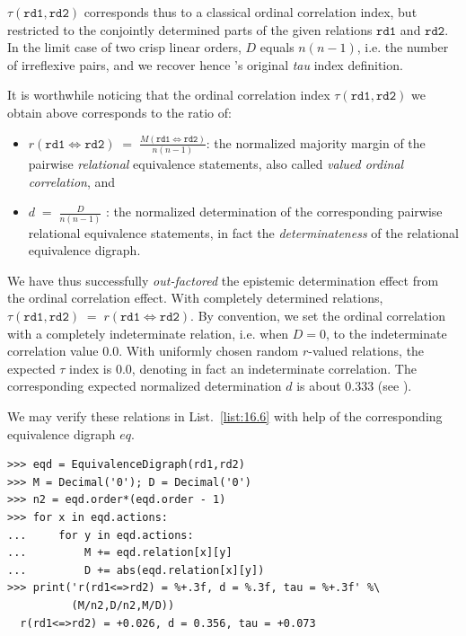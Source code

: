 $\tau(\mathtt{rd1},\mathtt{rd2})$ corresponds thus to a classical ordinal correlation index, but restricted to the conjointly determined parts of the given relations $\mathtt{rd1}$ and $\mathtt{rd2}$. In the limit case of two crisp linear orders, $D$ equals $n(n-1)$, i.e. the number of irreflexive pairs, and we recover hence \Kendall 's original \emph{tau} index definition.

It is worthwhile noticing that the ordinal correlation index $\tau(\mathtt{rd1},\mathtt{rd2})$ we obtain above corresponds to the ratio of:
\begin{itemize}
\item $r(\mathtt{rd1} \Leftrightarrow \mathtt{rd2}) \;=\; \frac{M(\mathtt{rd1} \Leftrightarrow \mathtt{rd2})}{n(n-1)}$: the normalized majority margin of the pairwise \emph{relational} equivalence statements, also called \emph{valued ordinal correlation}, and 
\item $d \;=\; \frac{D}{n(n-1)}$ : the normalized determination of the corresponding pairwise relational equivalence statements, in fact the \emph{determinateness} of the relational equivalence digraph.
\end{itemize}

We have thus successfully \emph{out-factored} the epistemic determination effect from the ordinal correlation effect. With completely determined relations, $\tau(\mathtt{rd1},\mathtt{rd2}) \;=\; r(\mathtt{rd1} \Leftrightarrow \mathtt{rd2})$. By convention, we set the ordinal correlation with a completely indeterminate relation, i.e. when $D = 0$, to the indeterminate correlation value $0.0$. With uniformly chosen random $r$-valued relations, the expected $\tau$ index is $0.0$, denoting in fact an indeterminate correlation. The corresponding expected normalized determination $d$ is about $0.333$ (see \citep{BIS-2012a}).

We may verify these relations in List.~\vref{list:16.6} with help of the corresponding equivalence digraph $eq$.
\begin{lstlisting}[caption={Computing the ordinal correlation index from the equivalence digraph},label=list:16.6]
>>> eqd = EquivalenceDigraph(rd1,rd2)
>>> M = Decimal('0'); D = Decimal('0')
>>> n2 = eqd.order*(eqd.order - 1)
>>> for x in eqd.actions:
...     for y in eqd.actions:
...         M += eqd.relation[x][y]
...         D += abs(eqd.relation[x][y])
>>> print('r(rd1<=>rd2) = %+.3f, d = %.3f, tau = %+.3f' %\
          (M/n2,D/n2,M/D))   
  r(rd1<=>rd2) = +0.026, d = 0.356, tau = +0.073  
\end{lstlisting}

